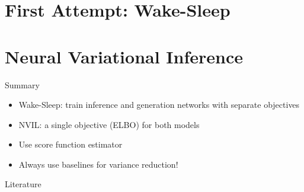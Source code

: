 \documentclass[14pt]{beamer}
\begin{document}
\begin{comment}  %
\begin{frame}{Recap: Variational Inference}
\begin{block}{Objective}
\begin{equation*}
\underset{q(z)}{\max}~\E{\log p(x,z)} + \Ent{q(z)}
\end{equation*}
\begin{itemize}
\item The ELBO is a lower bound on $ \log p(x) $
\item Mean field assumption: $ q(z) = \prod_{i=1}^{N}q(z_{i}) $
\end{itemize}
\end{block}
\end{frame}
\end{comment}

\section{First Attempt: Wake-Sleep}
\frame{\tableofcontents[currentsection]}




\section{Neural Variational Inference}
\frame{\tableofcontents[currentsection]}



\begin{frame}{Summary}
\begin{itemize}
\item Wake-Sleep: train inference and generation networks with separate objectives
\pause
\item NVIL: a single objective (ELBO) for both models\\ \pause
\item Use score function estimator\\ 
\pause
\item Always use baselines for variance reduction!
\end{itemize}
\end{frame}

\begin{frame}[allowframebreaks]{Literature}
\nocite{HintonEtAl:1995}
\nocite{MnihNVIL}
\nocite{greensmith2004variance}



\end{frame}
\end{document}
